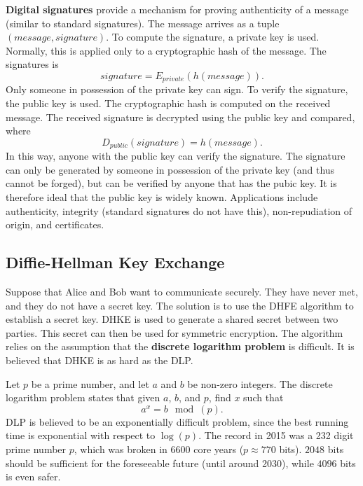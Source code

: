 \documentclass[11pt]{article}
\theoremstyle{plain} %
\theoremstyle{definition}
\theoremstyle{example}
\theoremstyle{remark}
\begin{document}
\textbf{Digital signatures} provide a mechanism for proving authenticity of a message (similar to standard signatures). The message arrives as a tuple $(message, signature)$. To compute the signature, a private key is used. Normally, this is applied only to a cryptographic hash of the message. The signatures is $$signature = E_{private}(h(message)).$$ Only someone in possession of the private key can sign. To verify the signature, the public key is used. The cryptographic hash is computed on the received message. The received signature is decrypted using the public key and compared, where 
$$D_{public} (signature) = h(message).$$
In this way, anyone with the public key can verify the signature. The signature can only be generated by someone in possession of the private key (and thus cannot be forged), but can be verified by anyone that has the pubic key. It is therefore ideal that the public key is widely known. Applications include authenticity, integrity (standard signatures do not have this), non-repudiation of origin, and certificates. 

\subsection{Diffie-Hellman Key Exchange}
Suppose that Alice and Bob want to communicate securely. They have never met, and they do not have a secret key. The solution is to use the DHFE algorithm to establish a secret key. DHKE is used to generate a shared secret between two parties. This secret can then be used for symmetric encryption. The algorithm relies on the assumption that the \textbf{discrete logarithm problem} is difficult. It is believed that DHKE is as hard as the DLP. 

Let $p$ be a prime number, and let $a$ and $b$ be non-zero integers. The discrete logarithm problem states that given $a$, $b$, and $p$, find $x$ such that $$a^x = b \mod (p).$$
DLP is believed to be an exponentially difficult problem, since the best running time is exponential with respect to $\log(p)$. The record in 2015 was a 232 digit prime number $p$, which was broken in 6600 core years ($p \approx 770$ bits). $2048$ bits should be sufficient for the foreseeable future (until around 2030), while $4096$ bits is even safer. 
\end{document}
